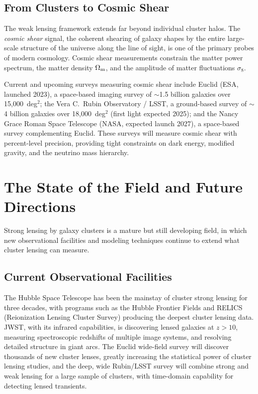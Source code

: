 \subsection{From Clusters to Cosmic Shear}

The weak lensing framework extends far beyond individual cluster
halos.  The \emph{cosmic shear} signal, the coherent shearing of
galaxy shapes by the entire large-scale structure of the universe
along the line of sight, is one of the primary probes of modern
cosmology.  Cosmic shear measurements constrain the matter power
spectrum, the matter density $\Omega_{\mathrm{m}}$, and the amplitude of matter
fluctuations $\sigma_8$.

Current and upcoming surveys measuring cosmic shear include Euclid
(ESA, launched 2023), a space-based imaging survey of $\sim$1.5
billion galaxies over 15{,}000~deg$^2$; the Vera C.~Rubin
Observatory / LSST, a ground-based survey of $\sim$4 billion
galaxies over 18{,}000~deg$^2$ (first light expected 2025); and the
Nancy Grace Roman Space Telescope (NASA, expected launch 2027), a
space-based survey complementing Euclid.  These surveys will measure
cosmic shear with percent-level precision, providing tight
constraints on dark energy, modified gravity, and the neutrino mass
hierarchy.


\section{The State of the Field and Future Directions}
\label{sec:future}

Strong lensing by galaxy clusters is a mature but still developing
field, in which new observational facilities and modeling techniques
continue to extend what cluster lensing can measure.

\subsection{Current Observational Facilities}

The Hubble Space Telescope has been the mainstay of cluster strong
lensing for three decades, with programs such as the Hubble Frontier
Fields and RELICS (Reionization Lensing Cluster Survey) producing the
deepest cluster lensing data.  JWST, with its infrared capabilities,
is discovering lensed galaxies at $z > 10$, measuring spectroscopic
redshifts of multiple image systems, and resolving detailed
structure in giant arcs.  The Euclid wide-field survey will discover
thousands of new cluster lenses, greatly increasing the statistical
power of cluster lensing studies, and the deep, wide Rubin/LSST
survey will combine strong and weak lensing for a large sample of
clusters, with time-domain capability for detecting lensed
transients.

